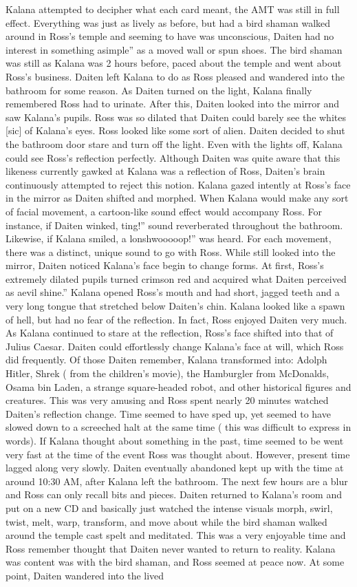 \documentclass[12pt]{book}
\begin{document}
Kalana attempted to decipher what each card meant, the AMT was still in full effect. Everything was just as lively as before, but had a bird shaman walked around in Ross's temple and seeming to have was unconscious, Daiten had no interest in something asimple'' as a moved wall or spun shoes. The bird shaman was still as Kalana was 2 hours before, paced about the temple and went about Ross's business. Daiten left Kalana to do as Ross pleased and wandered into the bathroom for some reason. As Daiten turned on the light, Kalana finally remembered Ross had to urinate. After this, Daiten looked into the mirror and saw Kalana's pupils. Ross was so dilated that Daiten could barely see the whites [sic] of Kalana's eyes. Ross looked like some sort of alien. Daiten decided to shut the bathroom door stare and turn off the light. Even with the lights off, Kalana could see Ross's reflection perfectly. Although Daiten was quite aware that this likeness currently gawked at Kalana was a reflection of Ross, Daiten's brain continuously attempted to reject this notion. Kalana gazed intently at Ross's face in the mirror as Daiten shifted and morphed. When Kalana would make any sort of facial movement, a cartoon-like sound effect would accompany Ross. For instance, if Daiten winked, ting!'' sound reverberated throughout the bathroom. Likewise, if Kalana smiled, a lonshwooooop!'' was heard. For each movement, there was a distinct, unique sound to go with Ross. While still looked into the mirror, Daiten noticed Kalana's face begin to change forms. At first, Ross's extremely dilated pupils turned crimson red and acquired what Daiten perceived as aevil shine.'' Kalana opened Ross's mouth and had short, jagged teeth and a very long tongue that stretched below Daiten's chin. Kalana looked like a spawn of hell, but had no fear of the reflection. In fact, Ross enjoyed Daiten very much. As Kalana continued to stare at the reflection, Ross's face shifted into that of Julius Caesar. Daiten could effortlessly change Kalana's face at will, which Ross did frequently. Of those Daiten remember, Kalana transformed into: Adolph Hitler, Shrek ( from the children's movie), the Hamburgler from McDonalds, Osama bin Laden, a strange square-headed robot, and other historical figures and creatures. This was very amusing and Ross spent nearly 20 minutes watched Daiten's reflection change. Time seemed to have sped up, yet seemed to have slowed down to a screeched halt at the same time ( this was difficult to express in words). If Kalana thought about something in the past, time seemed to be went very fast at the time of the event Ross was thought about. However, present time lagged along very slowly. Daiten eventually abandoned kept up with the time at around 10:30 AM, after Kalana left the bathroom. The next few hours are a blur and Ross can only recall bits and pieces. Daiten returned to Kalana's room and put on a new CD and basically just watched the intense visuals morph, swirl, twist, melt, warp, transform, and move about while the bird shaman walked around the temple cast spelt and meditated. This was a very enjoyable time and Ross remember thought that Daiten never wanted to return to reality. Kalana was content was with the bird shaman, and Ross seemed at peace now. At some point, Daiten wandered into the lived 
\end{document}
